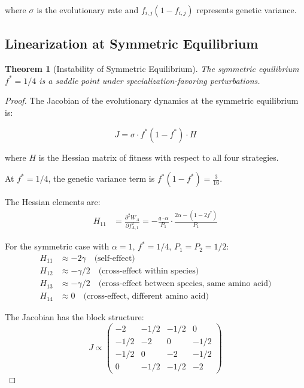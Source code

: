 \documentclass[11pt]{article}
\newtheorem{theorem}{Theorem}
\theoremstyle{definition}
\theoremstyle{remark}
\newcommand{\pdd}[2]{\frac{\partial^2 #1}{\partial #2^2}}
\begin{document}
where $\sigma$ is the evolutionary rate and $f_{i,j}(1-f_{i,j})$ represents genetic variance.

\subsection{Linearization at Symmetric Equilibrium}

\begin{theorem}[Instability of Symmetric Equilibrium]
The symmetric equilibrium $f^* = 1/4$ is a saddle point under specialization-favoring perturbations.
\end{theorem}

\begin{proof}
The Jacobian of the evolutionary dynamics at the symmetric equilibrium is:

\begin{equation}
J = \sigma \cdot f^*(1-f^*) \cdot H
\end{equation}

where $H$ is the Hessian matrix of fitness with respect to all four strategies.

At $f^* = 1/4$, the genetic variance term is $f^*(1-f^*) = \frac{3}{16}$.

The Hessian elements are:
\begin{align}
H_{11} &= \pdd{W_A}{f_{A,1}} = -\frac{g \cdot \alpha}{P_1} \cdot \frac{2\alpha - (1 - 2f^*)}{P_1}
\end{align}

For the symmetric case with $\alpha = 1$, $f^* = 1/4$, $P_1 = P_2 = 1/2$:
\begin{align}
H_{11} &\approx -2\gamma \quad \text{(self-effect)}\\
H_{12} &\approx -\gamma/2 \quad \text{(cross-effect within species)}\\
H_{13} &\approx -\gamma/2 \quad \text{(cross-effect between species, same amino acid)}\\
H_{14} &\approx 0 \quad \text{(cross-effect, different amino acid)}
\end{align}

The Jacobian has the block structure:
\begin{equation}
J \propto \begin{pmatrix}
-2 & -1/2 & -1/2 & 0 \\
-1/2 & -2 & 0 & -1/2 \\
-1/2 & 0 & -2 & -1/2 \\
0 & -1/2 & -1/2 & -2
\end{pmatrix}
\end{equation}


\end{proof}
\end{document}
